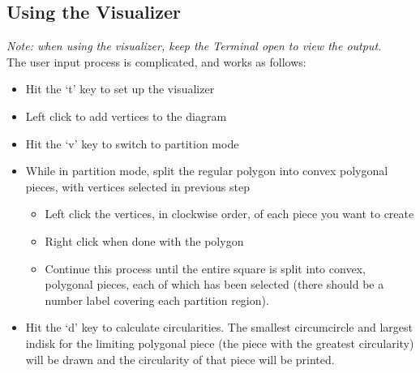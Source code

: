 \documentclass[11pt]{article}
\begin{document}
\subsection{Using the Visualizer}
\textit{Note: when using the visualizer, keep the Terminal open to view the output.} \\

The user input process is complicated, and works as follows:
\begin{itemize}
    \item Hit the `t' key to set up the visualizer
    \item Left click to add vertices to the diagram
    \item Hit the `v' key to switch to partition mode
    \item While in partition mode, split the regular polygon into convex polygonal pieces, with vertices selected in previous step
        \begin{itemize}
            \item Left click the vertices, in clockwise order, of each piece you want to create
            \item Right click when done with the polygon 
            \item Continue this process until the entire square is split into convex, polygonal pieces, each of which has been selected (there should be a number label covering each partition region).
        \end{itemize}
    \item Hit the `d' key to calculate circularities. The smallest circumcircle and largest indisk for the limiting polygonal piece (the piece with the greatest circularity) will be drawn and
    the circularity of that piece will be printed.
\end{itemize}
\end{document}

